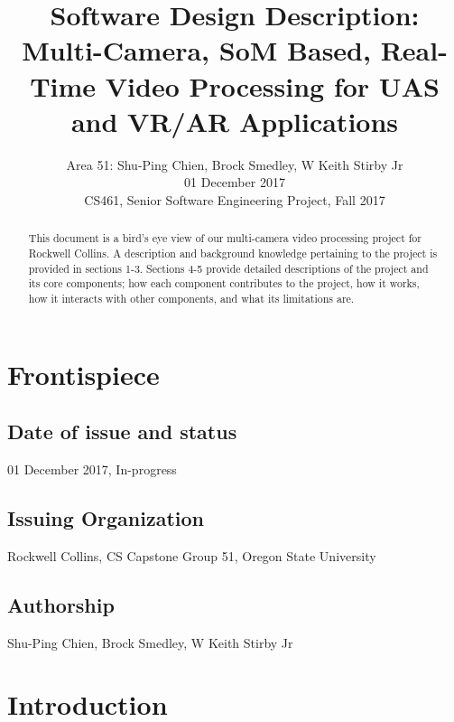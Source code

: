 \documentclass[letterpaper,10pt,serif,draftclsnofoot,onecolumn,compsoc,titlepage]{IEEEtran}
\title{Software Design Description: Multi-Camera, SoM Based, Real-Time Video Processing for UAS and VR/AR Applications}
\author{Area 51: Shu-Ping Chien, Brock Smedley, W Keith Stirby Jr \\ 01 December 2017 \\ CS461, Senior Software Engineering Project, Fall 2017}
\begin{document}
\begin{titlepage}
\maketitle

\begin{abstract}
This document is a bird's eye view of our multi-camera video processing project for 
Rockwell Collins. A description and background knowledge pertaining to the project 
is provided in sections 1-3. Sections 4-5 provide detailed descriptions of the project 
and its core components; how each component contributes to the project, how it works, 
how it interacts with other components, and what its limitations are. \\

\thispagestyle{empty}
\end{abstract}
\end{titlepage}


\newpage

\section{Frontispiece}

\subsection{Date of issue and status}

01 December 2017, In-progress \\

\subsection{Issuing Organization}

Rockwell Collins, CS Capstone Group 51, Oregon State University \\

\subsection{Authorship}

Shu-Ping Chien, Brock Smedley, W Keith Stirby Jr \\

\section{Introduction}
\end{document}
